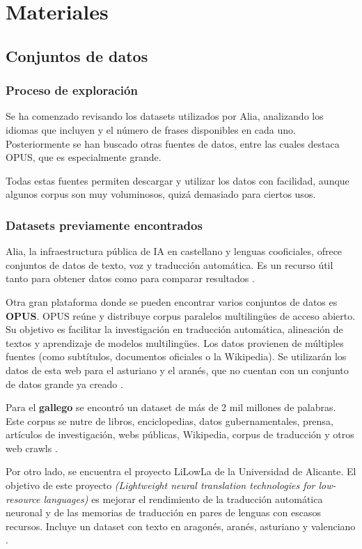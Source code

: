 \section{Materiales}

\subsection{Conjuntos de datos}
\label{conjuntos-de-datos}
\subsubsection{Proceso de exploración}
Se ha comenzado revisando los datasets utilizados por Alia, analizando los idiomas que incluyen y el número de frases disponibles en cada uno. 
Posteriormente se han buscado otras fuentes de datos, entre las cuales destaca OPUS, que es especialmente grande. 

Todas estas fuentes permiten descargar y utilizar los datos con facilidad, aunque algunos corpus son muy voluminosos, quizá demasiado para ciertos usos.

\subsubsection{Datasets previamente encontrados}

Alia, la infraestructura pública de IA en castellano y lenguas cooficiales, ofrece conjuntos de datos de texto, voz y traducción automática. Es un recurso útil tanto para obtener datos como para comparar resultados \cite{ALIA2025}.

Otra gran plataforma donde se pueden encontrar varios conjuntos de datos es \textbf{OPUS}. OPUS reúne y distribuye corpus paralelos multilingües de acceso abierto. Su objetivo es facilitar la investigación en traducción automática, alineación de textos y aprendizaje de modelos multilingües. Los datos provienen de múltiples fuentes (como subtítulos, documentos oficiales o la Wikipedia). Se utilizarán los datos de esta web para el asturiano y el aranés, que no cuentan con un conjunto de datos grande ya creado \cite{tiedemann-2012-parallel}.

Para el \textbf{gallego} se encontró un dataset de más de 2 mil millones de palabras. Este corpus se nutre de libros, enciclopedias, datos gubernamentales, prensa, artículos de investigación, webs públicas, Wikipedia, corpus de traducción y otros web crawls \cite{CorpusNOS-GL}.

Por otro lado, se encuentra el proyecto LiLowLa \cite{LiLowLa2022} de la Universidad de Alicante. El objetivo de este proyecto \textit{(Lightweight neural translation technologies for low-resource languages)} es mejorar el rendimiento de la traducción automática neuronal y de las memorias de traducción en pares de lenguas con escasos recursos. Incluye un dataset con texto en aragonés, aranés, asturiano y valenciano \cite{perez-ortiz-etal-2024-expanding}.

